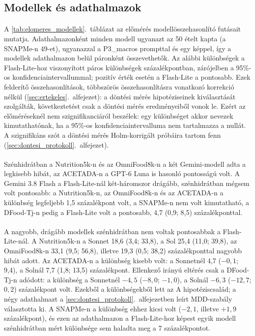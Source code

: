 \subsection{Modellek és adathalmazok}
\paragraph{}A \ref{tab:elomeres_modellek}.~táblázat az előmérés modellösszehasonlító futásait 
mutatja. Adathalmazonként minden modell ugyanazt az 50 ételt kapta (a SNAPMe-n 49-et), 
ugyanazzal a P3\_macros prompttal és egy képpel, így a modellek adathalmazon belül páronként 
összevethetők. Az alábbi különbségek a Flash-Lite-hoz viszonyított páros különbségek 
százalékpontban, zárójelben a 95\%-os konfidenciaintervallummal; pozitív érték esetén a 
Flash-Lite a pontosabb. Ezek felderítő összehasonlítások, többszörös összehasonlításra 
vonatkozó korrekció nélkül (\ref{sec:ertekeles}.~alfejezet): a döntési mérés hipotéziseinek 
kiválasztását szolgálták, következtetést csak a döntési mérés eredményeiből vonok le. Ezért az 
előméréseknél nem szignifikanciáról beszélek: egy különbséget akkor nevezek kimutathatónak, ha 
a 95\%-os konfidenciaintervalluma nem tartalmazza a nullát. A szignifikáns szót a döntési mérés 
Holm-korrigált próbáira tartom fenn (\ref{sec:dontesi_protokoll}.~alfejezet).

\paragraph{}Szénhidrátban a Nutrition5k-n és az OmniFood8k-n a két Gemini-modell adta a 
legkisebb hibát, az ACETADA-n a GPT-6 Luna is hasonló pontosságú volt. A Gemini 3.8 Flash 
a Flash-Lite-nál két-háromszor drágább, szénhidrátban mégsem volt pontosabb: a Nutrition5k-n, 
az OmniFood8k-n és az ACETADA-n a különbség legfeljebb 1,5 százalékpont volt, a SNAPMe-n nem volt kimutatható, a DFood-Tj-n pedig a 
Flash-Lite volt a pontosabb, 4,7 (0,9; 8,5) százalékponttal.

\paragraph{}A nagyobb, drágább modellek szénhidrátban nem voltak pontosabbak a Flash-Lite-nál. 
A Nutrition5k-n a Sonnet 18,6 (3,4; 33,8), a Sol 25,4 (11,0; 39,8), az OmniFood8k-n 
33,1 (9,5; 56,8), illetve 19,3 (0,5; 38,2) százalékponttal nagyobb hibát adott. Az ACETADA-n a 
különbség kisebb volt: a Sonnetnél 4,7 ($-0{,}1$; 9,4), a Solnál 7,7 (1,8; 13,5) százalékpont. 
Ellenkező irányú eltérés csak a DFood-Tj-n adódott: a különbség a Sonnetnél 
$-4{,}5$ ($-8{,}0$; $-1{,}0$), a Solnál $-6{,}3$ ($-12{,}7$; $0{,}2$) százalékpont volt. Ezekből a különbségekből lett az A 
hipotéziscsalád; a négy adathalmazt a \ref{sec:dontesi_protokoll}.~alfejezetben leírt 
MDD-szabály választotta ki. A SNAPMe-n a különbség ehhez kicsi volt 
($-2{,}1$, illetve $+1{,}9$ százalékpont), és ezen az adathalmazon a Flash-Lite-hoz képest 
egyik modell szénhidrátban mért különbsége sem haladta meg a 7 százalékpontot.

